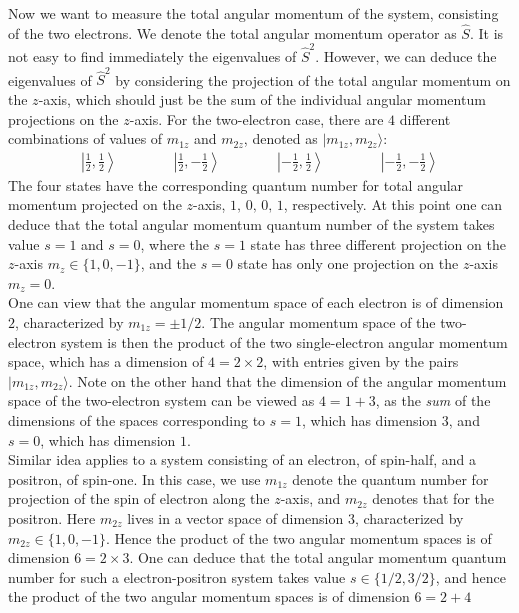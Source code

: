 \documentclass[11pt]{book}
\theoremstyle{break}
\theoremstyle{break}
\begin{document}
Now we want to measure the total angular momentum of the system, consisting of the two electrons. We denote the total angular momentum operator as $\hat{S}$. It is not easy to find immediately the eigenvalues of $\hat{S}^2$. However, we can deduce the eigenvalues of $\hat{S}^2$ by considering the projection of the total angular momentum on the $z$-axis, which should just be the sum of the individual angular momentum projections on the $z$-axis. For the two-electron case, there are $4$ different combinations of values of $m_{1z}$ and $m_{2z}$, denoted as $|m_{1z}, m_{2z}\rangle$:
\begin{align*}
\left|\frac{1}{2}, \frac{1}{2}\right\rangle \qquad\qquad 
\left|\frac{1}{2}, -\frac{1}{2}\right\rangle\qquad\qquad
\left|-\frac{1}{2}, \frac{1}{2}\right\rangle\qquad\qquad
\left|-\frac{1}{2}, -\frac{1}{2}\right\rangle
\end{align*}
The four states have the corresponding quantum number for total angular momentum projected on the $z$-axis, $1,\,0,\,0,\,1$, respectively. At this point one can deduce that the total angular momentum quantum number of the system takes value $s = 1$ and $s = 0$, where the $s=1$ state has three different projection on the $z$-axis $m_z\in \{1,0,-1\}$, and the $s=0$ state has only one projection on the $z$-axis $m_z = 0$.\\


One can view that the angular momentum space of each electron is of dimension $2$, characterized by $m_{1z} = \pm 1/2$. The angular momentum space of the two-electron system is then the product of the two single-electron angular momentum space, which has a dimension of $4 = 2\times 2$, with entries given by the pairs $|m_{1z},m_{2z}\rangle$. Note on the other hand that the dimension of the angular momentum space of the two-electron system can be viewed as $4 = 1+3$, as the \textit{sum} of the dimensions of the spaces corresponding to $s = 1$, which has dimension $3$, and $s = 0$, which has dimension $1$. \\

Similar idea applies to a system consisting of an electron, of spin-half, and a positron, of spin-one. In this case, we use $m_{1z}$ denote the quantum number for projection of the spin of electron along the $z$-axis, and $m_{2z}$ denotes that for the positron. Here $m_{2z}$ lives in a vector space of dimension $3$, characterized by $m_{2z} \in \{1,0,-1\}$. Hence the product of the two angular momentum spaces is of dimension $6 = 2\times 3$. One can deduce that the total angular momentum quantum number for such a electron-positron system takes value $s \in \{1/2, 3/2\}$, and hence the product of the two angular momentum spaces is of dimension $6 = 2+4$\\
\end{document}
